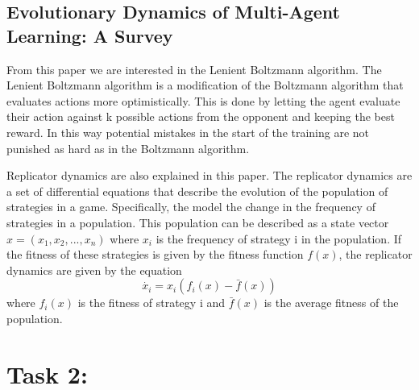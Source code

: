 \documentclass[12pt,letterpaper, onecolumn]{exam}
\begin{document}
\subsection{Evolutionary Dynamics of Multi-Agent Learning: A Survey}

From this paper we are interested in the Lenient Boltzmann algorithm. The Lenient Boltzmann algorithm is a modification of the Boltzmann algorithm that evaluates actions more optimistically.
This is done by letting the agent evaluate their action against k possible actions from the opponent and keeping the best reward. In this way potential mistakes in the start of the training
are not punished as hard as in the Boltzmann algorithm.

Replicator dynamics are also explained in this paper. The replicator dynamics are a set of differential equations that describe the evolution of the population of strategies in a game.
Specifically, the model the change in the frequency of strategies in a population. This population can be described as a state vector $x = (x_1, x_2, ..., x_n)$ where $x_i$ is the frequency of
strategy i in the population. If the fitness of these strategies is given by the fitness function $f(x)$, the replicator dynamics are given by the equation
\begin{equation}\label{eq:replicator}
    \dot{x_i} = x_i(f_i(x) - \bar{f}(x))
\end{equation}
where $f_i(x)$ is the fitness of strategy i and $\bar{f}(x)$ is the average fitness of the population.

\section{\textbf{Task 2:}}
\end{document}
